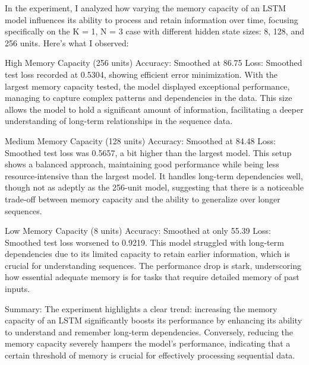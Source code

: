 \begin{answer}
    In the experiment, I analyzed how varying the memory capacity of an LSTM model influences its ability to process and retain information over time, focusing specifically on the K = 1, N = 3 case with different hidden state sizes: 8, 128, and 256 units. Here's what I observed:

High Memory Capacity (256 units)
Accuracy: Smoothed at 86.75%
Loss: Smoothed test loss recorded at 0.5304, showing efficient error minimization.
With the largest memory capacity tested, the model displayed exceptional performance, managing to capture complex patterns and dependencies in the data. This size allows the model to hold a significant amount of information, facilitating a deeper understanding of long-term relationships in the sequence data.

Medium Memory Capacity (128 units)
Accuracy: Smoothed at 84.48%
Loss: Smoothed test loss was 0.5657, a bit higher than the largest model.
This setup shows a balanced approach, maintaining good performance while being less resource-intensive than the largest model. It handles long-term dependencies well, though not as adeptly as the 256-unit model, suggesting that there is a noticeable trade-off between memory capacity and the ability to generalize over longer sequences.

Low Memory Capacity (8 units)
Accuracy: Smoothed at only 55.39%
Loss: Smoothed test loss worsened to 0.9219.
This model struggled with long-term dependencies due to its limited capacity to retain earlier information, which is crucial for understanding sequences. The performance drop is stark, underscoring how essential adequate memory is for tasks that require detailed memory of past inputs.

Summary:
The experiment highlights a clear trend: increasing the memory capacity of an LSTM significantly boosts its performance by enhancing its ability to understand and remember long-term dependencies. Conversely, reducing the memory capacity severely hampers the model’s performance, indicating that a certain threshold of memory is crucial for effectively processing sequential data.
  \end{answer}


